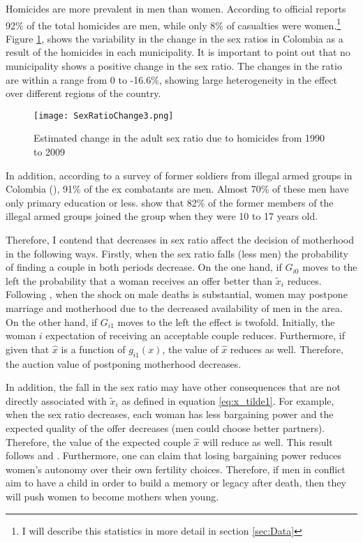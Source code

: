 \documentclass[a4paper,10pt,twocolumn,preprint,3p,authoryear]{elsarticle}
\begin{document}
Homicides are more prevalent in men than women. According to official reports 92\% of the total homicides are men, while only 8\% of casualties were women.\footnote{I will describe this statistics in more detail in section \ref{sec:Data}} Figure \ref{fig:D_SR}, shows the variability in the change in the sex ratios in Colombia as a result of the homicides in each municipality.  It is important to point out that no municipality shows a positive change in the sex ratio. The changes in the ratio are within a range from 0 to -16.6\%, showing large heterogeneity in the effect over different regions of the country.

\begin{figure}[h]
  \centering
  \texttt{[image: SexRatioChange3.png]}
  \caption{Estimated change in the adult sex ratio due to homicides from 1990 to 2009}
  \label{fig:D_SR}
\end{figure}

In addition, according to a survey of former soldiers from illegal armed groups in Colombia (\citet{Compes3554}), 91\% of the ex combatants are men. Almost 70\% of these men have only primary education or less. \citet{PintoBorregoLaHuerta2011} show that 82\% of the former members of the illegal armed groups joined the group when they were 10 to 17 years old.

Therefore, I contend that decreases in sex ratio affect the decision of motherhood in the following ways. Firstly, when the sex ratio falls (less men) the probability of finding a couple in both periods decrease. On the one hand, if $G_{i0}$ moves to the left the probability that a woman receives an offer better than $\tilde{x}_{i}$ reduces. Following \citet{Shemyakina2009}, when the shock on male deaths is substantial, women may postpone marriage and motherhood due to the decreased availability of men in the area. On the other hand, if $G_{i1}$ moves to the left the effect is twofold. Initially, the woman $i$ expectation of receiving an acceptable couple reduces. Furthermore, if given that $\hat{x}$ is a function of $g_{i1}\left( x \right)$, the value of $\hat{x}$ reduces as well. Therefore, the auction value of postponing motherhood decreases. 

In addition, the fall in the sex ratio may have other consequences that are not directly associated with $\tilde{x}_{i}$ as defined in equation \ref{eq:x_tilde1}. For example, when the sex ratio decreases, each woman has less bargaining power and the expected quality of the offer decreases (men could choose better partners). Therefore, the value of the expected couple $\hat{x}$ will reduce as well. This result follows \citet{AbramitzkyDelavandeVasconcelos2010} and \citet{ChiapporiFortinLacroix2002}. Furthermore, one can claim that losing bargaining power reduces women's autonomy over their own fertility choices. Therefore, if  men in conflict aim to have a child in order to build a memory or legacy after death, then they will push women to become mothers when young.   
\end{document}
